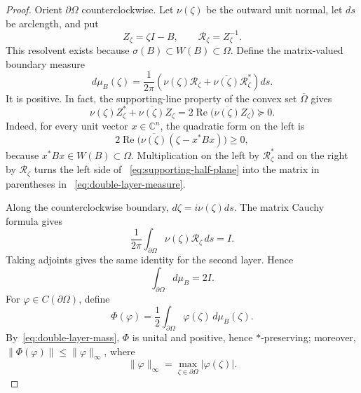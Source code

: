 \documentclass{aomart}
\theoremstyle{definition}
\newcommand{\C}{\mathbb C}
\newcommand{\RePart}{\operatorname{Re}}
\begin{document}
\begin{proof}
Orient $\partial\Omega$ counterclockwise.  Let $\nu(\zeta)$ be the
outward unit normal, let $ds$ be arclength, and put
\[
  Z_\zeta=\zeta I-B,
  \qquad
  \mathcal R_\zeta=Z_\zeta^{-1}.
\]
This resolvent exists because
$\sigma(B)\subset W(B)\subset\Omega$.  Define the matrix-valued
boundary measure
\begin{equation}
  d\mu_B(\zeta)=\frac{1}{2\pi}
  \left(
    \nu(\zeta)\mathcal R_\zeta+
    \overline{\nu(\zeta)}\mathcal R_\zeta^*
  \right)ds.
  \label{eq:double-layer-measure}
\end{equation}
It is positive.  In fact, the supporting-line property of the convex
set $\overline\Omega$ gives
\begin{equation}
  \nu(\zeta)Z_\zeta^*+\overline{\nu(\zeta)}Z_\zeta
  =2\RePart\bigl(\overline{\nu(\zeta)}Z_\zeta\bigr)\succeq0.
  \label{eq:supporting-half-plane}
\end{equation}
Indeed, for every unit vector $x\in\C^n$, the quadratic form on the
left is
\[
  2\RePart\bigl(\overline{\nu(\zeta)}
  (\zeta-x^*Bx)\bigr)\geq0,
\]
because $x^*Bx\in W(B)\subset\Omega$.
Multiplication on the left by $\mathcal R_\zeta^*$ and on the right by
$\mathcal R_\zeta$ turns the left side of~%
\eqref{eq:supporting-half-plane} into the matrix in parentheses in~%
\eqref{eq:double-layer-measure}.

Along the counterclockwise boundary,
$d\zeta=i\nu(\zeta)ds$.  The matrix Cauchy formula gives
\begin{equation}
  \frac{1}{2\pi}\int_{\partial\Omega}
  \nu(\zeta)\mathcal R_\zeta\,ds=I.
  \label{eq:first-layer-mass}
\end{equation}
Taking adjoints gives the same identity for the second layer.  Hence
\begin{equation}
  \int_{\partial\Omega}d\mu_B=2I.
  \label{eq:double-layer-mass}
\end{equation}
For $\varphi\in C(\partial\Omega)$, define
\begin{equation}
  \Phi(\varphi)=\frac12
  \int_{\partial\Omega}\varphi(\zeta)\,d\mu_B(\zeta).
  \label{eq:Phi-definition}
\end{equation}
By~\eqref{eq:double-layer-mass}, $\Phi$ is unital and positive, hence
$*$-preserving; moreover,
$\lVert\Phi(\varphi)\rVert\leq\lVert\varphi\rVert_\infty$, where
\[
  \lVert\varphi\rVert_\infty
  =\max_{\zeta\in\partial\Omega}\lvert\varphi(\zeta)\rvert.
\]


\end{proof}
\end{document}
